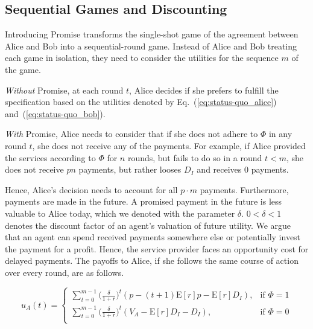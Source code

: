 \documentclass[runningheads]{llncs}
\newcommand{\sys}{Promise\xspace}
\newcommand{\rk}[1]{\todo[linecolor=red,backgroundcolor=red!25,bordercolor=blue,inline,caption={}]{Comment by Rami: #1}}
\begin{document}
\subsection{Sequential Games and Discounting}
Introducing \sys transforms the single-shot game of the agreement between Alice and Bob into a sequential-round game.
Instead of Alice and Bob treating each game in isolation, they need to consider the utilities for the sequence $m$ of the game.

\emph{Without} \sys, at each round $t$, Alice decides if she prefers to fulfill the specification based on the utilities denoted by Eq.~(\ref{eq:status-quo_alice}) and~(\ref{eq:status-quo_bob}).

\emph{With} \sys, Alice needs to consider that if she does not adhere to $\Phi$ in any round $t$, she does not receive any of the payments.
For example, if Alice provided the services according to $\Phi$ for $n$ rounds, but fails to do so in a round $t<m$, she does not receive $pn$ payments, but rather looses $D_I$ and receives $0$ payments.

Hence, Alice's decision needs to account for all $p \cdot m$ payments.
Furthermore, payments are made in the future.
A promised payment in the future is less valuable to Alice today, which we denoted with the parameter $\delta$.
$0<\delta<1$ denotes the discount factor of an agent's valuation of future utility. 
We argue that an agent can spend received payments somewhere else or potentially invest the payment for a profit.
Hence, the service provider faces an opportunity cost for delayed payments.
The payoffs to Alice, if she follows the same course of action over every round, are as follows. 

\begin{equation}
\label{eq:time_alice}
u_A(t) = 
\begin{cases}
    \sum_{t=0}^{m-1} \big( \frac{\delta}{1+r} \big)^{t} ( p - (t+1)\mathrm{E}[r]p -\mathrm{E}[r]D_{I}), & \text{if $\Phi=1$} \\
    \sum_{t=0}^{m-1} \big( \frac{\delta}{1+r} \big)^{t} (V_A - \mathrm{E}[r]D_{I}-D_{I}), & \text{if $\Phi=0$} \\
\end{cases}
\end{equation}
\end{document}
